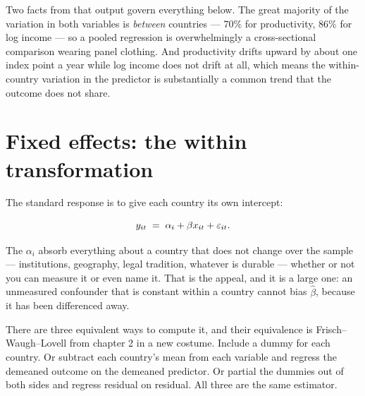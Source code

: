 \documentclass[
  letterpaper,
  10pt,
  twoside,
  openright,
  numbers=noenddot,
  chapterprefix=true]{scrbook}
\begin{document}
Two facts from that output govern everything below. The great majority
of the variation in both variables is \emph{between} countries --- 70\%
for productivity, 86\% for log income --- so a pooled regression is
overwhelmingly a cross-sectional comparison wearing panel clothing. And
productivity drifts upward by about one index point a year while log
income does not drift at all, which means the within-country variation
in the predictor is substantially a common trend that the outcome does
not share.

\section{Fixed effects: the within
transformation}\label{fixed-effects-the-within-transformation}

The standard response is to give each country its own intercept:

\[
y_{it} \thickspace=\thickspace \alpha_i + \beta x_{it} + \varepsilon_{it} .
\]

The \(\alpha_i\) absorb everything about a country that does not change
over the sample --- institutions, geography, legal tradition, whatever
is durable --- whether or not you can measure it or even name it. That
is the appeal, and it is a large one: an unmeasured confounder that is
constant within a country cannot bias \(\hat\beta\), because it has been
differenced away.

There are three equivalent ways to compute it, and their equivalence is
Frisch--Waugh--Lovell from chapter 2 in a new costume. Include a dummy
for each country. Or subtract each country's mean from each variable and
regress the demeaned outcome on the demeaned predictor. Or partial the
dummies out of both sides and regress residual on residual. All three
are the same estimator.
\end{document}
